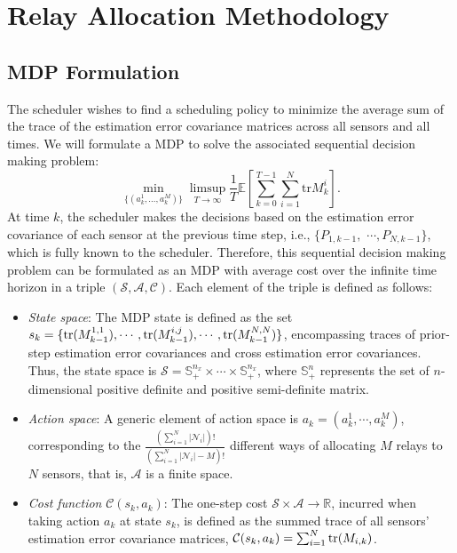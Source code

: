 \documentclass[twocolumn]{IEEEtran}
\newcommand{\tr}{{\rm tr}}
\begin{document}
\section{Relay Allocation Methodology}
\label{sec:DQN}
\subsection{MDP Formulation} \label{MDP}
The scheduler wishes to find a scheduling policy to minimize the average sum of the trace of the estimation error covariance matrices across all sensors and all times. We will formulate a MDP to solve the associated sequential decision making problem:
\begin{equation} \label{ACP}
    \min_{\{(a^{1}_{k},...,a^{M}_{k})\}}\limsup_{T\to\infty}\frac{1}{T}\mathbb{E}\left[\sum_{k=0}^{T-1}\sum_{i=1}^{N}\mathrm{tr}M^{i}_{k}\right] \text{.}
\end{equation}
At time $k$, the scheduler makes the decisions based on the estimation error covariance of each sensor at the previous time step, i.e., $\{P_{1,k-1},$ $\cdots, P_{N,k-1}\}$, which is fully known to the scheduler. Therefore, this sequential decision making problem can be formulated as an MDP with average cost over the infinite time horizon in a triple $(\mathcal{S}, \mathcal{A}, \mathcal{C})$. Each element of the triple is defined as follows:

\begin{itemize}
    \item {\it State space}: The MDP state is defined as the set $s_{k}=\{\tr(M_{k-1}^{1,1}),\cdots,\tr (M_{k-1}^{i,j}),\cdots,\tr (M_{k-1}^{N,N})\}$, encompassing traces of prior-step estimation error covariances and cross estimation error covariances. Thus, the state space is $\mathcal{S}=\mathbb{S}_{+}^{n_x}\times\cdots\times\mathbb{S}_{+}^{n_x}$, where $\mathbb{S}_{+}^n$ represents the set of $n$-dimensional positive definite and positive semi-definite matrix.
    \item { \it Action space}: A generic element of action space is $a_k=(a^{1}_{k},\cdots,a^{M}_{k})$, corresponding to the $\frac{(\sum_{i=1}^N|\mathcal{N}_i|)!}{(\sum_{i=1}^N|\mathcal{N}_i|-M)!}$ different ways of allocating $M$ relays to $N$ sensors, that is, $\mathcal{A}$ is a finite space.
    \item {\it Cost function} $\mathcal{C}(s_{k},a_{k})$: The one-step cost $\mathcal{S} \times \mathcal{A} \to \mathbb{R}$, incurred when taking action $a_k$ at state $s_k$, is defined as the summed trace of all sensors' estimation error covariance matrices, $\mathcal{C}(s_{k},a_{k})=\sum_{i=1}^{N}\tr(M_{i,k})$.
    
\end{itemize}
\end{document}
